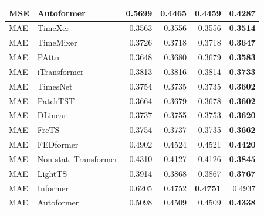 \begin{longtable}{llrrrr}
MSE & Autoformer & 0.5699 & 0.4465 & 0.4459 & \textbf{0.4287} \\
\midrule
MAE & TimeXer & 0.3563 & 0.3556 & 0.3556 & \textbf{0.3514} \\
MAE & TimeMixer & 0.3726 & 0.3718 & 0.3718 & \textbf{0.3647} \\
MAE & PAttn & 0.3648 & 0.3680 & 0.3679 & \textbf{0.3583} \\
MAE & iTransformer & 0.3813 & 0.3816 & 0.3814 & \textbf{0.3733} \\
MAE & TimesNet & 0.3754 & 0.3735 & 0.3735 & \textbf{0.3602} \\
MAE & PatchTST & 0.3664 & 0.3679 & 0.3678 & \textbf{0.3602} \\
MAE & DLinear & 0.3737 & 0.3755 & 0.3753 & \textbf{0.3620} \\
MAE & FreTS & 0.3754 & 0.3737 & 0.3735 & \textbf{0.3662} \\
MAE & FEDformer & 0.4902 & 0.4524 & 0.4521 & \textbf{0.4420} \\
MAE & Non-stat. Transformer & 0.4310 & 0.4127 & 0.4126 & \textbf{0.3845} \\
MAE & LightTS & 0.3914 & 0.3868 & 0.3867 & \textbf{0.3767} \\
MAE & Informer & 0.6205 & 0.4752 & \textbf{0.4751} & 0.4937 \\
MAE & Autoformer & 0.5098 & 0.4509 & 0.4509 & \textbf{0.4338} \\
\end{longtable}
\endgroup

